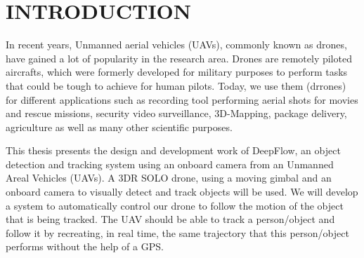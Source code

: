 %
%
%


\pagestyle{myheadings}
\setcounter{page}{1}


\chapter{\uppercase {Introduction}}
\let\thefootnote\relax{}
In recent years, Unmanned aerial vehicles (UAVs), commonly known as drones, have gained a lot of popularity in the research area. Drones are  remotely piloted aircrafts, which  were formerly developed for military purposes to perform tasks that could be tough to achieve for human pilots. Today, we use them (drrones) for different applications such as recording tool performing aerial shots for movies and rescue missions, security video surveillance, 3D-Mapping, package delivery, agriculture as well as many other scientific purposes.

This thesis presents the design and development work of DeepFlow, an object detection and tracking system using an onboard camera from an Unmanned Areal Vehicles (UAVs). A 3DR SOLO drone, using a moving gimbal and an onboard camera to visually detect and track objects will be used. We will develop a system to automatically control our drone to follow the motion of the object that is being tracked. The UAV should be able to track a person/object and follow it by recreating, in real time, the same trajectory that this person/object performs without the help of a GPS.



